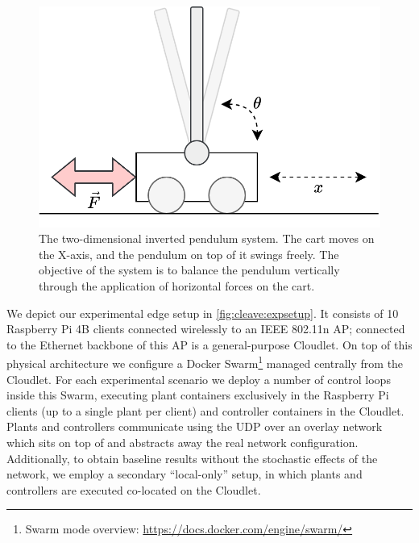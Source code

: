 \begin{figure}
    \centering
    \includegraphics[width=.7\columnwidth]{images/inverted_pendulum.png}
    \caption{
        The two-dimensional inverted pendulum system.
        The cart moves on the X-axis, and the pendulum on top of it swings freely.
        The objective of the system is to balance the pendulum vertically through the application of horizontal forces on the cart.
    }\label{fig:invpend}
\end{figure}

We depict our experimental edge setup in \cref{fig:cleave:expsetup}.
It consists of \num{10} Raspberry Pi 4B  clients connected wirelessly to an IEEE 802.11n \ac{AP}; connected to the Ethernet backbone of this \ac{AP} is a general-purpose Cloudlet.
On top of this physical architecture we configure a Docker Swarm\footnote{Swarm mode overview: \url{https://docs.docker.com/engine/swarm/}} managed centrally from the Cloudlet.
For each experimental scenario we deploy a number of control loops inside this Swarm, executing plant containers exclusively in the Raspberry Pi clients (up to a single plant per client) and controller containers in the Cloudlet.
Plants and controllers communicate using the \ac{UDP} over an overlay network which sits on top of and abstracts away the real network configuration.
Additionally, to obtain baseline results without the stochastic effects of the network, we employ a secondary ``local-only'' setup, in which plants and controllers are executed co-located on the Cloudlet.

